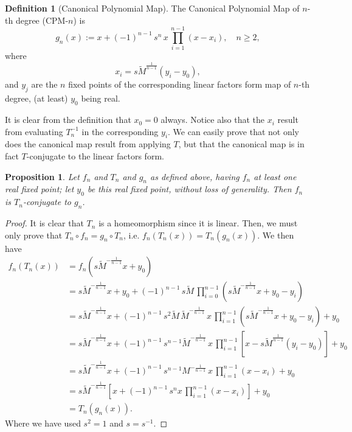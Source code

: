 \documentclass[10pt,twoside,titlepage]{book}
\numberwithin{equation}{chapter}
\numberwithin{figure}{chapter}
\numberwithin{table}{chapter}
\theoremstyle{plain}%
\newtheorem{prop}[thm]{Proposition}
\theoremstyle{definition}
\newtheorem{defn}{Definition}[chapter]
\theoremstyle{remark}
\begin{document}
\begin{defn}[Canonical Polynomial Map]
	\label{def:CanonicalPolynomialMap}
	The Canonical Polynomial Map of $n$-th degree (CPM-$n$) is
	\begin{equation}
		g_n(x):=x+(-1)^{n-1}\,s^n\,x\,\prod_{i=1}^{n-1}(x-x_i),\quad n\geq 2,
	\end{equation}
	where
	\[x_i=s\tilde{M}^{\frac{1}{n-1}}(y_i-y_0),\]
	and $y_j$ are the $n$ fixed points of the corresponding linear factors form map of $n$-th degree, (at least) $y_0$ being real.
\end{defn}

It is clear from the definition that $x_0=0$ always. Notice also that the $x_i$ result from evaluating $T_n^{-1}$ in the corresponding $y_i$. We can easily prove that not only does the canonical map result from applying $T$, but that the canonical map is in fact $T$-conjugate to the linear factors form.

\begin{prop}
	Let $f_n$ and $T_n$ and $g_n$ as defined above, having $f_n$ at least one real fixed point; let $y_0$ be this real fixed point, without loss of generality. Then $f_n$ is $T_n$-conjugate to $g_n$.
\end{prop}
\begin{proof}
	It is clear that $T_n$ is a homeomorphism since it is linear. Then, we must only prove that $T_n\circ f_n = g_n\circ T_n$, i.e. $f_n(T_n(x))=T_n(g_n(x))$. We then have
	\begin{equation}
		\begin{aligned}
			f_n(T_n(x))	&=f_n(s\tilde{M}^{-\frac{1}{n-1}}x+y_0)\\
			&=s\tilde{M}^{-\frac{1}{n-1}}x+y_0 + (-1)^{n-1}\,s\tilde{M}\,\prod_{i=0}^{n-1} (s\tilde{M}^{-\frac{1}{n-1}}x+y_0-y_i)\\
			&=s\tilde{M}^{-\frac{1}{n-1}}x+(-1)^{n-1}\,s^2\tilde{M}\,\tilde{M}^{-\frac{1}{n-1}}\,x\,\prod_{i=1}^{n-1}(s\tilde{M}^{-\frac{1}{n-1}}x+y_0-y_i)+y_0\\
			&=s\tilde{M}^{-\frac{1}{n-1}}x+(-1)^{n-1}\,s^{n-1}\tilde{M}^{-\frac{1}{n-1}}\,x\,\prod_{i=1}^{n-1}\left[x-s\tilde{M}^{\frac{1}{n-1}}(y_i-y_0)\right]+y_0\\
			&=s\tilde{M}^{-\frac{1}{n-1}}x+(-1)^{n-1}\,s^{n-1}M^{-\frac{1}{n-1}}\,x\,\prod_{i=1}^{n-1}\left(x-x_i\right)+y_0\\
			&=s\tilde{M}^{-\frac{1}{n-1}} \left[ x+(-1)^{n-1}\,s^n x\,\prod_{i=1}^{n-1}\left(x-x_i\right)\right]+y_0\\
			&=T_n(g_n(x)).
		\end{aligned}
	\end{equation}
	Where we have used $s^2=1$ and $s=s^{-1}$.
\end{proof}
\end{document}

